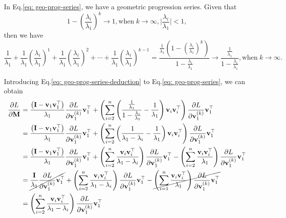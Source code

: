 \documentclass{article}
\newcommand{\bM}{\mathbf{M}}
\newcommand{\bv}{\mathbf{v}}
\newcommand{\bI}{\mathbf{I}}
\begin{document}
	In Eq.\ref{eq: geo-prog-series}, we have a geometric progression series.
	Given that $${1 - (\frac{\lambda_{i}}{\lambda_{1}})^k \rightarrow 1}, \text{when} \; k\rightarrow\infty, \vert \frac{\lambda_{i}}{\lambda_{1}} \vert<1,$$
	then we have
	\begin{equation}
	\frac{1}{\lambda_{1}} +
	\frac{1}{\lambda_{1}}\left(\frac{\lambda_{i}}{\lambda_{1}}\right)^{1} +
	\frac{1}{\lambda_{1}}\left(\frac{\lambda_{i}}{\lambda_{1}}\right)^{2} + \cdots +
	\frac{1}{\lambda_{1}}\left(\frac{\lambda_{i}}{\lambda_{1}}\right)^{k-1} = \frac{\frac{1}{\lambda_{1}}(1- (\frac{\lambda_{i}}{\lambda_{1}})^k)} {1 - \frac{\lambda_{i}}{\lambda_{1}}} 
	\rightarrow  \frac{\frac{1}{\lambda_{1}}}
	{1 - \frac{\lambda_{i}}{\lambda_{1}}}, \text{when} \; k\rightarrow\infty.
	\label{eq: geo-prog-series-deduction}
	\end{equation}
	
	Introducing Eq.\ref{eq: geo-prog-series-deduction} to Eq.\ref{eq: geo-prog-series}, we can obtain	
	\begin{equation}
	\begin{aligned}
	\frac{\partial L}{\partial \bM}
	&=\frac{\left(\bI-\bv_{1} \bv_{1}^{\top}\right)}{\lambda_{1}} \frac{\partial L}{\partial \bv_{1}^{(k)}}\bv_{1}^{\top} +
	\left(\sum_{i=2}^{n}\left(
	\frac{\frac{1}{\lambda_{1}}}
	{1 - \frac{\lambda_{i}}{\lambda_{1}}}
	- \frac{1}{\lambda_{1}}
	\right)
	\bv_{i}\bv_{i}^{\top}
	\right)\frac{\partial L}{\partial \bv_{1}^{(k)}}\bv_{1}^{\top}\\
	&=\frac{\left(\bI-\bv_{1} \bv_{1}^{\top}\right)}{\lambda_{1}} \frac{\partial L}{\partial \bv_{1}^{(k)}}\bv_{1}^{\top} +
	\left(\sum_{i=2}^{n}\left(
	\frac{1}
	{\lambda_{1} - \lambda_{i}}
	- \frac{1}{\lambda_{1}}
	\right)
	\bv_{i}\bv_{i}^{\top}
	\right)\frac{\partial L}{\partial \bv_{1}^{(k)}}\bv_{1}^{\top}\\
	&=\frac{\left(\bI-\bv_{1} \bv_{1}^{\top}\right)}{\lambda_{1}} \frac{\partial L}{\partial \bv_{1}^{(k)}}\bv_{1}^{\top} +
	\left(\sum_{i=2}^{n}
	\frac{\bv_{i}\bv_{i}^{\top}}
	{\lambda_{1} - \lambda_{i}}
	\right)\frac{\partial L}{\partial \bv_{1}^{(k)}}\bv_{1}^{\top} -
	\left(\sum_{i=2}^{n}
	\frac{\bv_{i}\bv_{i}^{\top}}
	{\lambda_{1}}
	\right)\frac{\partial L}{\partial \bv_{1}^{(k)}}\bv_{1}^{\top}\\
	&=\cancel{\frac{\bI}{\lambda_{1}}\frac{\partial L}{\partial \bv_{1}^{(k)}}\bv_{1}^{\top}} +
	\left(\sum_{i=2}^{n}
	\frac{\bv_{i}\bv_{i}^{\top}}
	{\lambda_{1} - \lambda_{i}}
	\right)\frac{\partial L}{\partial \bv_{1}^{(k)}}\bv_{1}^{\top} -
	\cancel{
	\left(\sum_{i=1}^{n}
	\frac{\bv_{i}\bv_{i}^{\top}}
	{\lambda_{1}}
	\right)\frac{\partial L}{\partial \bv_{1}^{(k)}}\bv_{1}^{\top}}\\
	&=\left(\sum_{i=2}^{n}
	\frac{\bv_{i}\bv_{i}^{\top}}
	{\lambda_{1} - \lambda_{i}}
	\right)\frac{\partial L}{\partial \bv_{1}^{(k)}}\bv_{1}^{\top}\\
	\end{aligned}
	\label{eq: final-form}
	\end{equation}
	
\end{document}
